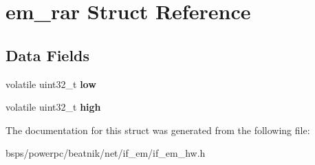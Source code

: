 \hypertarget{structem__rar}{}\section{em\+\_\+rar Struct Reference}
\label{structem__rar}
\subsection*{Data Fields}
\begin{DoxyCompactItemize}
\item 
\mbox{\label{structem__rar_adf00a8e34ce00cb0864b7c7f56f40f9e}} 
volatile uint32\+\_\+t {\bfseries low}
\item 
\mbox{\label{structem__rar_a793a4e5152fc7aa1ece5f7f04861d51b}} 
volatile uint32\+\_\+t {\bfseries high}
\end{DoxyCompactItemize}


The documentation for this struct was generated from the following file\+:\begin{DoxyCompactItemize}
\item 
bsps/powerpc/beatnik/net/if\+\_\+em/if\+\_\+em\+\_\+hw.\+h\end{DoxyCompactItemize}
